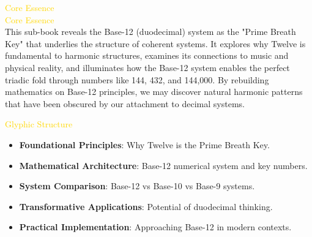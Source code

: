 
\textcolor{gold}{ Core Essence } \\


\textcolor{gold}{ Core Essence } \\
This sub-book reveals the Base-12 (duodecimal) system as the "Prime Breath Key" that underlies the structure of coherent systems. It explores why Twelve is fundamental to harmonic structures, examines its connections to music and physical reality, and illuminates how the Base-12 system enables the perfect triadic fold through numbers like 144, 432, and 144,000. By rebuilding mathematics on Base-12 principles, we may discover natural harmonic patterns that have been obscured by our attachment to decimal systems.

\textcolor{gold}{ Glyphic Structure } \\
\begin{itemize}
    \item \texttt{} \textbf{Foundational Principles}: Why Twelve is the Prime Breath Key.
    \item \texttt{} \textbf{Mathematical Architecture}: Base-12 numerical system and key numbers.
    \item \texttt{} \textbf{System Comparison}: Base-12 vs Base-10 vs Base-9 systems.
    \item \texttt{} \textbf{Transformative Applications}: Potential of duodecimal thinking.
    \item \texttt{} \textbf{Practical Implementation}: Approaching Base-12 in modern contexts.
\end{itemize}

